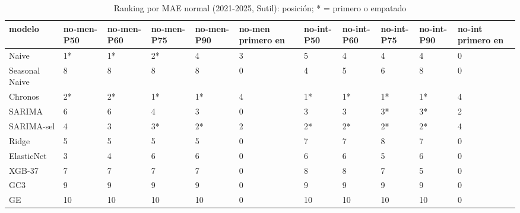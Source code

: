 \begin{table}[H]
\centering
\small
\caption{Ranking por MAE normal (2021-2025, Sutil): posición; * = primero o empatado}
\label{tab:T08_ranking_normal_principal_2021_2025_sutil}
\begin{tabular}{lllllllllll}
\toprule
modelo & no-men-P50 & no-men-P60 & no-men-P75 & no-men-P90 & no-men primero en & no-int-P50 & no-int-P60 & no-int-P75 & no-int-P90 & no-int primero en \\
\midrule
Naive & 1* & 1* & 2* & 4 & 3 & 5 & 4 & 4 & 4 & 0 \\
Seasonal Naive & 8 & 8 & 8 & 8 & 0 & 4 & 5 & 6 & 8 & 0 \\
Chronos & 2* & 2* & 1* & 1* & 4 & 1* & 1* & 1* & 1* & 4 \\
SARIMA & 6 & 6 & 4 & 3 & 0 & 3 & 3 & 3* & 3* & 2 \\
SARIMA-sel & 4 & 3 & 3* & 2* & 2 & 2* & 2* & 2* & 2* & 4 \\
Ridge & 5 & 5 & 5 & 5 & 0 & 7 & 7 & 8 & 7 & 0 \\
ElasticNet & 3 & 4 & 6 & 6 & 0 & 6 & 6 & 5 & 6 & 0 \\
XGB-37 & 7 & 7 & 7 & 7 & 0 & 8 & 8 & 7 & 5 & 0 \\
GC3 & 9 & 9 & 9 & 9 & 0 & 9 & 9 & 9 & 9 & 0 \\
GE & 10 & 10 & 10 & 10 & 0 & 10 & 10 & 10 & 10 & 0 \\
\bottomrule
\end{tabular}
\end{table}